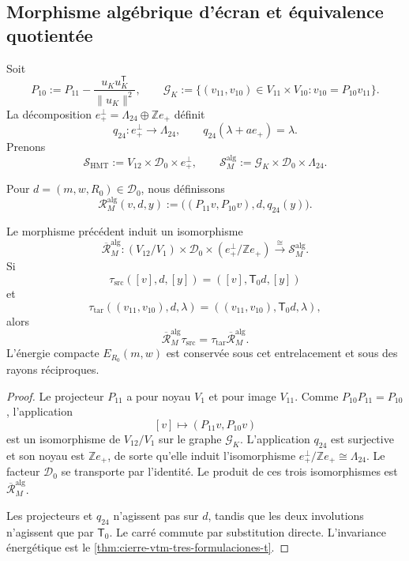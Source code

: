 \subsection{Morphisme algébrique d'écran et équivalence quotientée}

Soit
\[
 P_{10}:=P_{11}-\frac{u_Ku_K^{\mathsf T}}{\lVert u_K\rVert^2},
 \qquad
 \mathscr G_K:=
 \{(v_{11},v_{10})\in V_{11}\times V_{10}:
             v_{10}=P_{10}v_{11}\}.
\]
La décomposition
\(e_+^\perp=\Lambda_{24}\oplus\mathbb Ze_+\) définit
\[
 q_{24}:e_+^\perp\longrightarrow\Lambda_{24},
 \qquad q_{24}(\lambda+ae_+)=\lambda.
\]
Prenons
\[
 \mathscr S_{\mathrm{HMT}}
 :=V_{12}\times\mathscr D_0\times e_+^\perp,
 \qquad
 \mathscr S_M^{\mathrm{alg}}
 :=\mathscr G_K\times\mathscr D_0\times\Lambda_{24}.
\]

\begin{definition}
\label{def:cierre-vtm-rm-algebraico}
Pour \(d=(m,w,R_0)\in\mathscr D_0\), nous définissons
\[
 \boxed{
 \mathcal R_M^{\mathrm{alg}}(v,d,y)
 :=\bigl((P_{11}v,P_{10}v),d,q_{24}(y)\bigr).}
\]
\end{definition}

\begin{theorem}
\label{thm:cierre-vtm-rm-algebraico}
Le morphisme précédent induit un isomorphisme
\[
 \boxed{
 \overline{\mathcal R}_M^{\mathrm{alg}}:
 (V_{12}/V_1)\times\mathscr D_0
 \times(e_+^\perp/\mathbb Ze_+)
 \xrightarrow{\ \cong\ }
 \mathscr S_M^{\mathrm{alg}}.}
\]
Si
\[
 \tau_{\mathrm{src}}([v],d,[y])
 =([v],\mathsf T_0d,[y])
\]
et
\[
 \tau_{\mathrm{tar}}((v_{11},v_{10}),d,\lambda)
 =((v_{11},v_{10}),\mathsf T_0d,\lambda),
\]
alors
\[
 \overline{\mathcal R}_M^{\mathrm{alg}}\tau_{\mathrm{src}}
 =\tau_{\mathrm{tar}}\overline{\mathcal R}_M^{\mathrm{alg}}.
\]
L'énergie compacte \(E_{R_0}(m,w)\) est conservée sous cet
entrelacement et sous des rayons réciproques.
\end{theorem}

\begin{proof}
Le projecteur \(P_{11}\) a pour noyau \(V_1\) et pour image \(V_{11}\). Comme
\(P_{10}P_{11}=P_{10}\), l'application
\[
 [v]\longmapsto(P_{11}v,P_{10}v)
\]
est un isomorphisme de \(V_{12}/V_1\) sur le graphe
\(\mathscr G_K\). L'application \(q_{24}\) est surjective et son noyau est
\(\mathbb Ze_+\), de sorte qu'elle induit l'isomorphisme
\(e_+^\perp/\mathbb Ze_+\cong\Lambda_{24}\). Le facteur
\(\mathscr D_0\) se transporte par l'identité. Le produit de ces trois
isomorphismes est \(\overline{\mathcal R}_M^{\mathrm{alg}}\).

Les projecteurs et \(q_{24}\) n'agissent pas sur \(d\), tandis que les deux
involutions n'agissent que par \(\mathsf T_0\). Le carré commute
par substitution directe. L'invariance énergétique est le
\cref{thm:cierre-vtm-tres-formulaciones-t}.
\end{proof}

